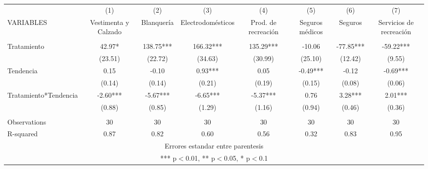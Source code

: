 \documentclass[]{article}
\begin{document}
\begin{tabular}{lccccccc} \hline
 & (1) & (2) & (3) & (4) & (5) & (6) & (7) \\
VARIABLES & Vestimenta y Calzado & Blanquería & Electrodomésticos & Prod. de recreación & Seguros médicos & Seguros & Servicios de recreación \\ \hline
 &  &  &  &  &  &  &  \\
Tratamiento & 42.97* & 138.75*** & 166.32*** & 135.29*** & -10.06 & -77.85*** & -59.22*** \\
 & (23.51) & (22.72) & (34.63) & (30.99) & (25.10) & (12.42) & (9.55) \\
Tendencia & 0.15 & -0.10 & 0.93*** & 0.05 & -0.49*** & -0.12 & -0.69*** \\
 & (0.14) & (0.14) & (0.21) & (0.19) & (0.15) & (0.08) & (0.06) \\
Tratamiento*Tendencia & -2.60*** & -5.67*** & -6.65*** & -5.37*** & 0.76 & 3.28*** & 2.01*** \\
 & (0.88) & (0.85) & (1.29) & (1.16) & (0.94) & (0.46) & (0.36) \\
 &  &  &  &  &  &  &  \\
Observations & 30 & 30 & 30 & 30 & 30 & 30 & 30 \\
 R-squared & 0.87 & 0.82 & 0.60 & 0.56 & 0.32 & 0.83 & 0.95 \\ \hline
\multicolumn{8}{c}{ Errores estandar entre parentesis} \\
\multicolumn{8}{c}{ *** p$<$0.01, ** p$<$0.05, * p$<$0.1} \\
\end{tabular}
\end{document}
